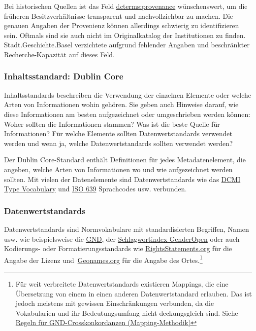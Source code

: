 \documentclass[
  letterpaper,
  DIV=11,
  numbers=noendperiod,
  landscape,
  a4paper,
  geometry:margin=1in]{scrartcl}
\begin{document}
Bei historischen Quellen ist das Feld
\href{https://www.dublincore.org/specifications/dublin-core/dcmi-terms/terms/provenance/}{dcterms:provenance}
wünschenswert, um die früheren Besitzverhältnisse transparent und
nachvollziehbar zu machen. Die genauen Angaben der Provenienz können
allerdings schwierig zu identifizieren sein. Oftmals sind sie auch nicht
im Originalkatalog der Institutionen zu finden. Stadt.Geschichte.Basel
verzichtete aufgrund fehlender Angaben und beschränkter
Recherche-Kapazität auf dieses Feld.

\subsubsection{Inhaltsstandard: Dublin
Core}\label{inhaltsstandard-dublin-core}

Inhaltsstandards beschreiben die Verwendung der einzelnen Elemente oder
welche Arten von Informationen wohin gehören. Sie geben auch Hinweise
darauf, wie diese Informationen am besten aufgezeichnet oder
umgeschrieben werden können: Woher sollten die Informationen stammen?
Was ist die beste Quelle für Informationen? Für welche Elemente sollten
Datenwertstandards verwendet werden und wenn ja, welche
Datenwertstandards sollten verwendet werden?

Der Dublin Core-Standard enthält Definitionen für jedes
Metadatenelement, die angeben, welche Arten von Informationen wo und wie
aufgezeichnet werden sollten. Mit vielen der Datenelemente sind
Datenwertstandards wie das
\href{https://www.dublincore.org/specifications/dublin-core/dcmi-type-vocabulary/}{DCMI
Type Vocabulary} und
\href{https://www.iso.org/iso-639-language-codes.html}{ISO 639}
Sprachcodes usw. verbunden.

\subsubsection{Datenwertstandards}\label{datenwertstandards}

Datenwertstandards sind Normvokabulare mit standardisierten Begriffen,
Namen usw. wie beispielsweise die \href{https://gnd.network/}{GND}, der
\href{https://opengenderplatform.de/schlagwortindex}{Schlagwortindex
GenderOpen} oder auch Kodierungs- oder Formatierungsstandards wie
\href{http://rightsstatements.org}{RightsStatements.org} für die Angabe
der Lizenz und~\href{https://www.geonames.org/}{Geonames.org} für die
Angabe des Ortes.\footnote{Für weit verbreitete Datenwertstandards
  existieren Mappings, die eine Übersetzung von einem in einen anderen
  Datenwertstandard erlauben. Das ist jedoch meistens mit gewissen
  Einschränkungen verbunden, da die Vokabularien und ihr
  Bedeutungsumfang nicht deckungsgleich sind. Siehe
  \href{https://wiki.dnb.de/pages/viewpage.action?pageId=263851113}{Regeln
  für GND-Crosskonkordanzen (Mapping-Methodik)}}
\end{document}
